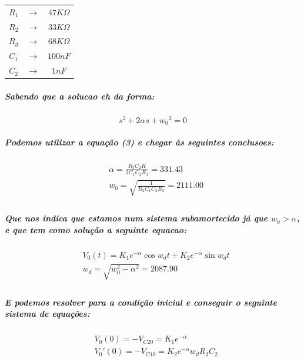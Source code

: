 \documentclass[12pt,twoside, a4paper, twocolumn]{article}
\begin{document}
\begin{center}
    \begin{tabular}{ |ccc| }
        \hline
        $R_1$ & $\rightarrow$ & $47K\varOmega$ \\
        $R_2$ & $\rightarrow$ & $33K\varOmega$ \\
        $R_3$ & $\rightarrow$ & $68K\varOmega$ \\
        $C_1$ & $\rightarrow$ & $100nF$        \\
        $C_2$ & $\rightarrow$ & $1nF$          \\

        \hline
    \end{tabular}
\end{center}

\subparagraph*{Sabendo que a solucao eh da forma:}

\begin{equation*}
    s^2 + 2 \alpha s + w_0{^2} = 0
\end{equation*}

\subparagraph*{Podemos utilizar a equação (3) e chegar às seguintes conclusoes:}

\begin{equation}
    \begin{aligned}
         & \alpha = \frac{R_3 C_2 K }{2 C_1 C_2 R_3} = 331.43 \\
         & w_0 = \sqrt{ \frac{1}{R_2 C_1 C_2 R_3}}= 2111.00   \\
    \end{aligned}
\end{equation}

\subparagraph*{Que nos indica que estamos num sistema subamortecido já que $w_0 > \alpha$, e que tem como solução a seguinte equacao:}

\begin{equation}
    \begin{aligned}
         & V_0(t) = K_1 e^{-\alpha} \cos{w_d t} + K_2 e^{-\alpha} \sin{w_d t} \\
         & w_d = \sqrt{w_0^2 - \alpha^2} = 2087.90                            \\
    \end{aligned}
\end{equation}

\subparagraph*{E podemos resolver para a condição inicial e conseguir o seguinte sistema de equações:}

\begin{equation}
    \begin{aligned}
         & V_0(0) = -V_{C20} = K_1 e^{-\alpha}              \\
         & V_0'(0) = -V_{C10} = K_2 e^{-\alpha} w_d R_3 C_2
    \end{aligned}
\end{equation}
\end{document}
